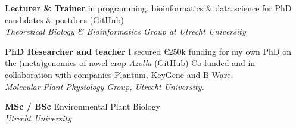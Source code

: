 \documentclass[a4paper,10pt]{article}
\begin{document}
{\begin{adjustbox}{valign=t}
\begin{minipage}[t]{0.3\textwidth}
\begin{spacing}{1}
\begin{itemize}[leftmargin=2em, itemindent=-1em]

\end{itemize}
\end{spacing}


\end{minipage}%
\end{adjustbox}%
\hfill%


\begin{adjustbox}{valign=t}
\hfill%
\begin{minipage}[t]{0.05\textwidth}
\MyVerticalRule
\end{minipage}%
\end{adjustbox}

\begin{adjustbox}{valign=t}
\hfill%
\begin{minipage}[t]{0.6\textwidth}


\begin{description}
\raggedright
  \item[\normalfont \textcolor{ForestGreen}{\textbf{2022 -- now.}}] \textbf{Lecturer \&  Trainer} 
    in programming, bioinformatics \& data science for PhD candidates \& postdocs 
    (\href{https://github.com/lauralwd/professional_education}{GitHub})\\
    \textit{Theoretical Biology \& Bioinformatics Group at Utrecht University}
  \item[\normalfont \textcolor{ForestGreen}{\textbf{2017 -- 2022.}}] \textbf{PhD Researcher and teacher} 
    I secured €250k funding for my own PhD on the (meta)genomics of novel crop \textit{Azolla} 
    (\href{https://github.com/lauralwd/azolla_phd_thesis}{GitHub}) 
    Co-funded and in collaboration with companies Plantum, KeyGene and B-Ware.\\ 
    \textit{Molecular Plant Physiology Group, Utrecht University.}
  \item[\normalfont \textcolor{ForestGreen}{\textbf{2010 -- 2017.}}] \textbf{MSc / BSc} Environmental Plant Biology \\
    \textit{Utrecht University}
\end{description}


\end{minipage}
\end{adjustbox}}
\end{document}
